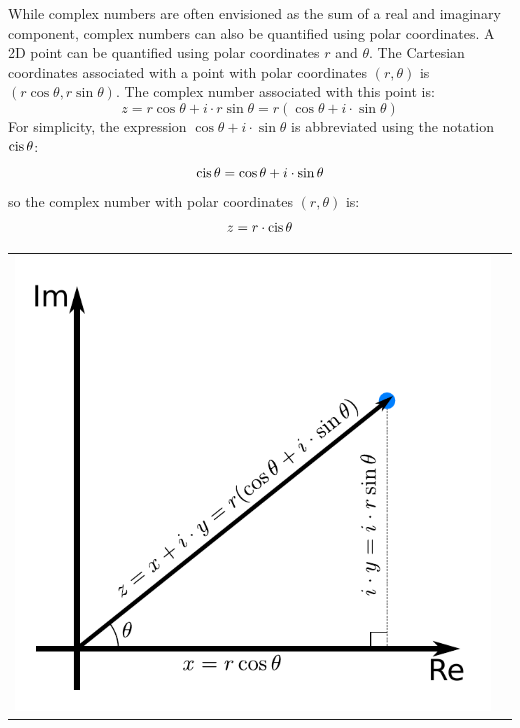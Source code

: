 \documentclass{article}
\newcommand{\cis}{\textnormal{cis}\,}
\begin{document}
While complex numbers are often envisioned as the sum of a real and imaginary component, complex numbers can also be quantified using polar coordinates. A 2D point can be quantified using polar coordinates \(r\) and \(\theta\). The Cartesian coordinates associated with a point with polar coordinates \((r, \theta)\) is \((r\cos\theta, r\sin\theta)\). The complex number associated with this point is:
\[z = r \cos\theta + i \cdot r\sin\theta = r(\cos\theta + i \cdot \sin\theta)\]
For simplicity, the expression \(\cos\theta + i \cdot \sin\theta\) is abbreviated using the notation \(\cis\theta\): 
\[\cis\theta = \cos\theta + i \cdot \sin\theta\]
so the complex number with polar coordinates \((r,\theta)\) is:
\[z = r \cdot \cis\theta\]

\begin{center}
\begin{tabular}{cc}
\parbox{0.5\textwidth}{
\includegraphics[scale = 0.7]{complex_number}
} & \parbox{0.5\textwidth}{
}
\end{tabular}
\end{center}
\end{document}
